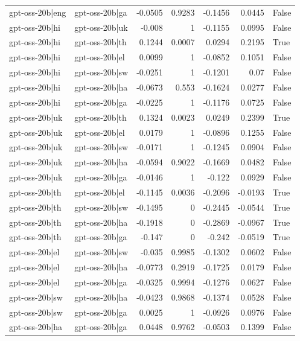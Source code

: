 \begin{table}
\begin{tabular}{l l r r r r l}
gpt-oss-20b|eng & gpt-oss-20b|ga & -0.0505 & 0.9283 & -0.1456 & 0.0445 & False \\
gpt-oss-20b|hi & gpt-oss-20b|uk & -0.008 & 1 & -0.1155 & 0.0995 & False \\
gpt-oss-20b|hi & gpt-oss-20b|th & 0.1244 & 0.0007 & 0.0294 & 0.2195 & True \\
gpt-oss-20b|hi & gpt-oss-20b|el & 0.0099 & 1 & -0.0852 & 0.1051 & False \\
gpt-oss-20b|hi & gpt-oss-20b|sw & -0.0251 & 1 & -0.1201 & 0.07 & False \\
gpt-oss-20b|hi & gpt-oss-20b|ha & -0.0673 & 0.553 & -0.1624 & 0.0277 & False \\
gpt-oss-20b|hi & gpt-oss-20b|ga & -0.0225 & 1 & -0.1176 & 0.0725 & False \\
gpt-oss-20b|uk & gpt-oss-20b|th & 0.1324 & 0.0023 & 0.0249 & 0.2399 & True \\
gpt-oss-20b|uk & gpt-oss-20b|el & 0.0179 & 1 & -0.0896 & 0.1255 & False \\
gpt-oss-20b|uk & gpt-oss-20b|sw & -0.0171 & 1 & -0.1245 & 0.0904 & False \\
gpt-oss-20b|uk & gpt-oss-20b|ha & -0.0594 & 0.9022 & -0.1669 & 0.0482 & False \\
gpt-oss-20b|uk & gpt-oss-20b|ga & -0.0146 & 1 & -0.122 & 0.0929 & False \\
gpt-oss-20b|th & gpt-oss-20b|el & -0.1145 & 0.0036 & -0.2096 & -0.0193 & True \\
gpt-oss-20b|th & gpt-oss-20b|sw & -0.1495 & 0 & -0.2445 & -0.0544 & True \\
gpt-oss-20b|th & gpt-oss-20b|ha & -0.1918 & 0 & -0.2869 & -0.0967 & True \\
gpt-oss-20b|th & gpt-oss-20b|ga & -0.147 & 0 & -0.242 & -0.0519 & True \\
gpt-oss-20b|el & gpt-oss-20b|sw & -0.035 & 0.9985 & -0.1302 & 0.0602 & False \\
gpt-oss-20b|el & gpt-oss-20b|ha & -0.0773 & 0.2919 & -0.1725 & 0.0179 & False \\
gpt-oss-20b|el & gpt-oss-20b|ga & -0.0325 & 0.9994 & -0.1276 & 0.0627 & False \\
gpt-oss-20b|sw & gpt-oss-20b|ha & -0.0423 & 0.9868 & -0.1374 & 0.0528 & False \\
gpt-oss-20b|sw & gpt-oss-20b|ga & 0.0025 & 1 & -0.0926 & 0.0976 & False \\
gpt-oss-20b|ha & gpt-oss-20b|ga & 0.0448 & 0.9762 & -0.0503 & 0.1399 & False \\
\bottomrule
\end{tabular}
\end{table}
